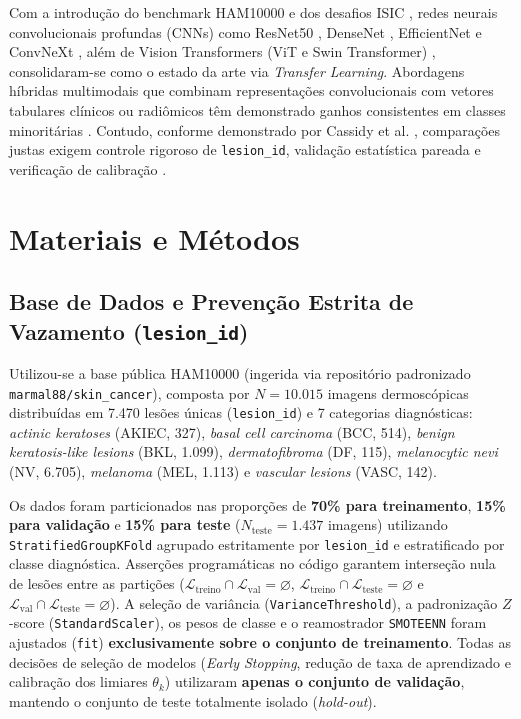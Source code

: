 \documentclass[12pt,a4paper]{article}
\begin{document}
Com a introdução do benchmark HAM10000 \cite{tschandl2018} e dos desafios ISIC \cite{codella2019, tschandl2020}, redes neurais convolucionais profundas (CNNs) como ResNet50 \cite{he2016, maron2019}, DenseNet \cite{huang2017}, EfficientNet \cite{tan2019, tan2021} e ConvNeXt \cite{liu2022}, além de Vision Transformers (ViT e Swin Transformer) \cite{dosovitskiy2021, liu2021swin, xin2022, aladhadh2022}, consolidaram-se como o estado da arte via \textit{Transfer Learning}. Abordagens híbridas multimodais que combinam representações convolucionais com vetores tabulares clínicos ou radiômicos têm demonstrado ganhos consistentes em classes minoritárias \cite{yap2018, pacheco2020, ningrum2021}. Contudo, conforme demonstrado por Cassidy et al. \cite{cassidy2022}, comparações justas exigem controle rigoroso de \texttt{lesion\_id}, validação estatística pareada \cite{demvsar2006} e verificação de calibração \cite{guo2017}.

\section{Materiais e Métodos}

\subsection{Base de Dados e Prevenção Estrita de Vazamento (\texttt{lesion\_id})}
Utilizou-se a base pública HAM10000 \cite{tschandl2018} (ingerida via repositório padronizado \texttt{marmal88/skin\_cancer}), composta por $N = 10.015$ imagens dermoscópicas distribuídas em 7.470 lesões únicas (\texttt{lesion\_id}) e 7 categorias diagnósticas: \textit{actinic keratoses} (AKIEC, 327), \textit{basal cell carcinoma} (BCC, 514), \textit{benign keratosis-like lesions} (BKL, 1.099), \textit{dermatofibroma} (DF, 115), \textit{melanocytic nevi} (NV, 6.705), \textit{melanoma} (MEL, 1.113) e \textit{vascular lesions} (VASC, 142).

Os dados foram particionados nas proporções de \textbf{70\% para treinamento}, \textbf{15\% para validação} e \textbf{15\% para teste} ($N_{\text{teste}} = 1.437$ imagens) utilizando \texttt{StratifiedGroupKFold} agrupado estritamente por \texttt{lesion\_id} e estratificado por classe diagnóstica. Asserções programáticas no código garantem interseção nula de lesões entre as partições ($\mathcal{L}_{\text{treino}} \cap \mathcal{L}_{\text{val}} = \varnothing$, $\mathcal{L}_{\text{treino}} \cap \mathcal{L}_{\text{teste}} = \varnothing$ e $\mathcal{L}_{\text{val}} \cap \mathcal{L}_{\text{teste}} = \varnothing$). A seleção de variância (\texttt{VarianceThreshold}), a padronização $Z$-score (\texttt{StandardScaler}), os pesos de classe e o reamostrador \texttt{SMOTEENN} foram ajustados (\texttt{fit}) \textbf{exclusivamente sobre o conjunto de treinamento}. Todas as decisões de seleção de modelos (\textit{Early Stopping}, redução de taxa de aprendizado e calibração dos limiares $\theta_k$) utilizaram \textbf{apenas o conjunto de validação}, mantendo o conjunto de teste totalmente isolado (\textit{hold-out}).
\end{document}
